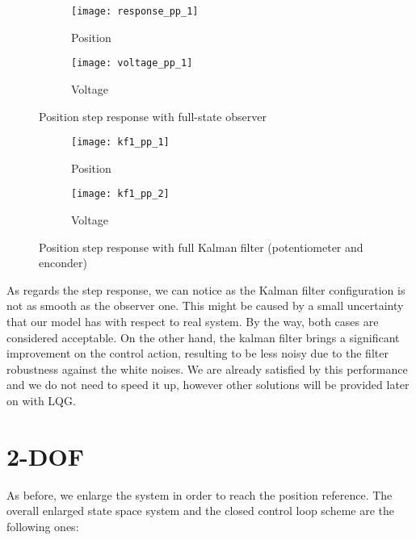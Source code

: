 \begin{figure*}[h]
	\centering
	\begin{subfigure}{0.45\columnwidth}
		\texttt{[image: response\_pp\_1]}
		\caption{Position}
	\end{subfigure}
	\begin{subfigure}{0.45\columnwidth}
		\texttt{[image: voltage\_pp\_1]}
		\caption{Voltage}
	\end{subfigure}
	\caption{Position step response with full-state observer}
	\label{fig:Position step response with full-state observer}
\end{figure*}

\begin{figure*}[h]
	\centering
	\begin{subfigure}{0.45\columnwidth}
		\texttt{[image: kf1\_pp\_1]}
		\caption{Position}
	\end{subfigure}
	\begin{subfigure}{0.45\columnwidth}
		\texttt{[image: kf1\_pp\_2]}
		\caption{Voltage}
	\end{subfigure}
	\caption{Position step response with full Kalman filter (potentiometer and enconder)}
	\label{fig:Position step response with full Kalman filter}
\end{figure*}

As regards the step response, we can notice as the Kalman filter configuration is not as smooth as the observer one. This might be caused by a small uncertainty that our model has with respect to real system. By the way, both cases are considered acceptable. On the other hand, the kalman filter brings a significant improvement on the control action, resulting to be less noisy due to the filter robustness against the white noises.
We are already satisfied by this performance and we do not need to speed it up, however other solutions will be provided later on with LQG.

\section{2-DOF}
As before, we enlarge the system in order to reach the position reference. The overall enlarged state space system and the closed control loop scheme are the following ones:

